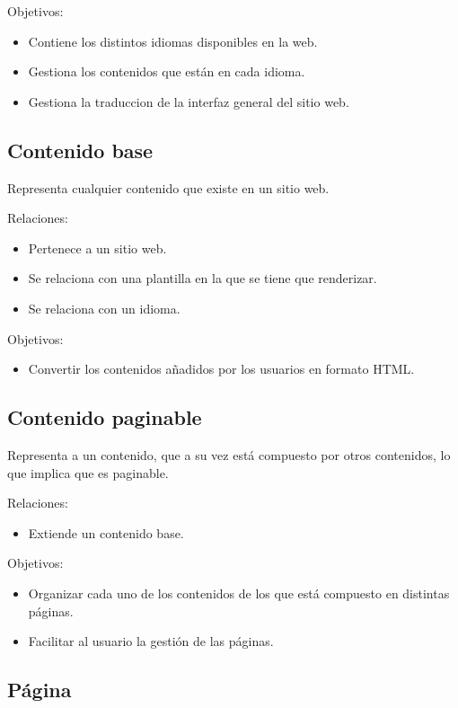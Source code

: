 Objetivos:
\begin{itemize}
    \item Contiene los distintos idiomas disponibles en la web.
    \item Gestiona los contenidos que están en cada idioma.
    \item Gestiona la traduccion de la interfaz general del sitio web.
\end{itemize}

\subsection{Contenido base}

Representa cualquier contenido que existe en un sitio web.

Relaciones:
\begin{itemize}
    \item Pertenece a un sitio web.
    \item Se relaciona con una plantilla en la que se tiene que renderizar.
    \item Se relaciona con un idioma.
\end{itemize}

Objetivos:
\begin{itemize}
    \item Convertir los contenidos añadidos por los usuarios en formato HTML.
\end{itemize}

\subsection{Contenido paginable}

Representa a un contenido, que a su vez está compuesto por otros contenidos, lo que implica
que es paginable.

Relaciones:
\begin{itemize}
    \item Extiende un contenido base.
\end{itemize}

Objetivos:
\begin{itemize}
    \item Organizar cada uno de los contenidos de los que está compuesto en distintas páginas.
    \item Facilitar al usuario la gestión de las páginas.
\end{itemize}

\subsection{Página}

